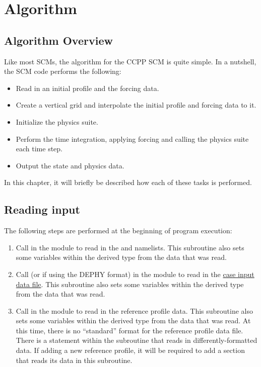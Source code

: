 \chapter{Algorithm}
\label{chapter: algorithm}

\section{Algorithm Overview}

Like most SCMs, the algorithm for the CCPP SCM is quite simple. In a nutshell, the SCM code performs the following:
\begin{itemize}
\item Read in an initial profile and the forcing data.
\item Create a vertical grid and interpolate the initial profile and forcing data to it.
\item Initialize the physics suite.
\item Perform the time integration, applying forcing and calling the physics suite each time step.
\item Output the state and physics data.
\end{itemize}
In this chapter, it will briefly be described how each of these tasks is performed.

\section{Reading input}
The following steps are performed at the beginning of program execution:
\begin{enumerate}
\item Call  in the  module to read in the \hyperref[subsection: case config]{} and \hyperref[subsection: physics config]{} namelists. This subroutine also sets some variables within the  derived type from the data that was read.
\item Call  (or  if using the DEPHY format) in the  module to read in the \hyperref[subsection: case input]{case input data file}. This subroutine also sets some variables within the  derived type from the data that was read.
\item Call  in the  module to read in the reference profile data. This subroutine also sets some variables within the  derived type from the data that was read. At this time, there is no ``standard'' format for the reference profile data file. There is a  statement within the  subroutine that reads in differently-formatted data. If adding a new reference profile, it will be required to add a section that reads its data in this subroutine.
\end{enumerate}

